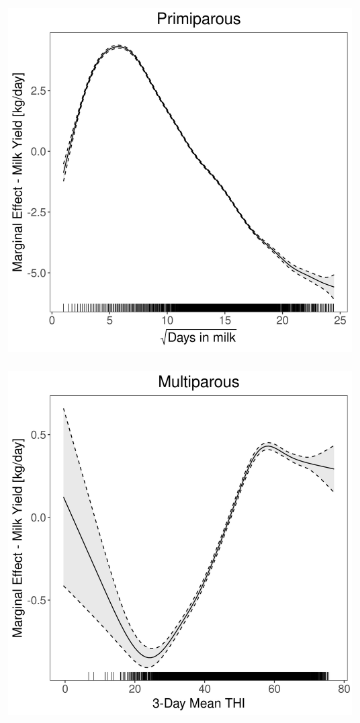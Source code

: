 \begin{figure}[H]
\begin{subfigure}[b]{0.45\textwidth}
    \end{subfigure}
    \hspace{0.05\textwidth} %
    \begin{subfigure}[b]{0.45\textwidth}
        \centering
        \includegraphics[width=\textwidth]{thesis/figures/models/milk/after2010/je_milk_after2010/je_milk_after2010_marginal_dim_milk_primi.png}
    \end{subfigure}
    \begin{subfigure}[b]{0.45\textwidth}
        \centering
        \includegraphics[width=\textwidth]{thesis/figures/models/milk/after2010/je_milk_after2010/je_milk_after2010_marginal_thi_milk_multi.png}

\end{subfigure}
\end{figure}
